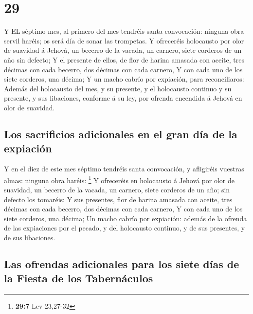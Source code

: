 \hypertarget{section-28}{%
\section{29}\label{section-28}}

 Y EL séptimo mes, al primero del mes tendréis santa
convocación: ninguna obra servil haréis; os será día de sonar las
trompetas.  Y ofreceréis holocausto por olor de suavidad á
Jehová, un becerro de la vacada, un carnero, siete corderos de un año
sin defecto;  Y el presente de ellos, de flor de harina
amasada con aceite, tres décimas con cada becerro, dos décimas con cada
carnero,  Y con cada uno de los siete corderos, una décima;
 Y un macho cabrío por expiación, para reconciliaros:
 Además del holocausto del mes, y su presente, y el
holocausto continuo y su presente, y sus libaciones, conforme á su ley,
por ofrenda encendida á Jehová en olor de suavidad.

\hypertarget{los-sacrificios-adicionales-en-el-gran-duxeda-de-la-expiaciuxf3n}{%
\subsection{Los sacrificios adicionales en el gran día de la
expiación}\label{los-sacrificios-adicionales-en-el-gran-duxeda-de-la-expiaciuxf3n}}

 Y en el diez de este mes séptimo tendréis santa
convocación, y afligiréis vuestras almas: ninguna obra haréis:
\footnote{\textbf{29:7} Lev 23,27-32}  Y ofreceréis en
holocausto á Jehová por olor de suavidad, un becerro de la vacada, un
carnero, siete corderos de un año; sin defecto los tomaréis:
 Y sus presentes, flor de harina amasada con aceite, tres
décimas con cada becerro, dos décimas con cada carnero,  Y
con cada uno de los siete corderos, una décima;  Un macho
cabrío por expiación: además de la ofrenda de las expiaciones por el
pecado, y del holocausto continuo, y de sus presentes, y de sus
libaciones.

\hypertarget{las-ofrendas-adicionales-para-los-siete-duxedas-de-la-fiesta-de-los-tabernuxe1culos}{%
\subsection{Las ofrendas adicionales para los siete días de la Fiesta de
los
Tabernáculos}\label{las-ofrendas-adicionales-para-los-siete-duxedas-de-la-fiesta-de-los-tabernuxe1culos}}

